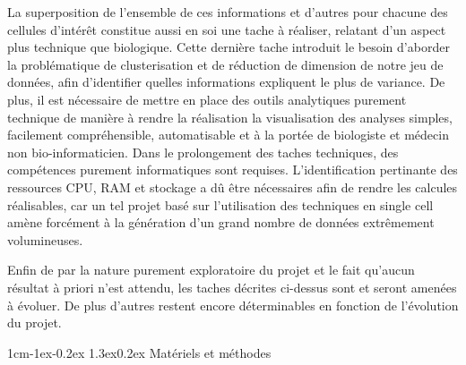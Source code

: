 \documentclass[12pt]{report}
\makeatletter
\renewcommand\subsection{\@startsection{subsection}{2}{\z@}%
	{1cm\@plus -1ex\@minus -0.2ex}%
	{1.3ex\@plus 0.2ex}%
	{\reset@font\large\bf}}
\makeatother
\begin{document}
La superposition de l'ensemble de ces informations et d'autres pour chacune des cellules d'intérêt constitue aussi en soi une tache à réaliser, relatant d'un aspect plus technique que biologique. 
Cette dernière tache introduit le besoin d'aborder la problématique de clusterisation et de réduction de dimension de notre jeu de données, afin d'identifier quelles informations expliquent le plus de variance. 
De plus, il est nécessaire de mettre en place des outils analytiques purement technique de manière à rendre la réalisation la visualisation des analyses simples, facilement compréhensible, automatisable et à la portée de biologiste et médecin non bio-informaticien.
Dans le prolongement des taches techniques, des compétences purement informatiques sont requises. L'identification pertinante des ressources CPU, RAM et stockage a dû être nécessaires afin de rendre les calcules réalisables, 
car un tel projet basé sur l'utilisation des techniques en single cell amène forcément à la génération d'un grand nombre de données extrêmement volumineuses.

Enfin de par la nature purement exploratoire du projet et le fait qu'aucun résultat à priori n'est attendu, les taches décrites ci-dessus sont et seront amenées à évoluer.
De plus d'autres restent encore déterminables en fonction de l'évolution du projet.




\subsection{Matériels et méthodes}
\end{document}
